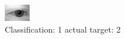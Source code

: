 \begin{figure}[h!]
\begin{center}
\includegraphics[width=0.60\columnwidth]{figures/ID467_class_1_target_2.png}
\end{center}
\caption{ Classification: 1 actual target: 2}
\label{fig:ID467_class_1_target_2}
\end{figure}
